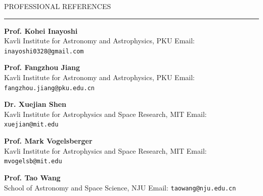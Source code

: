 \documentclass{resume} %
\renewenvironment{rSection}[1]{
\sectionskip
\textcolor{CarnegieMellonRed}{\MakeUppercase{#1}}
\sectionlineskip
\hrule
\begin{list}{}{
\setlength{\leftmargin}{1.5em}
}
\item[]
}{
\end{list}
}
\begin{document}
\begin{rSection}{Professional references} \itemsep -2pt
{\bf Prof. Kohei Inayoshi } \\
Kavli Institute for Astronomy and Astrophysics, PKU \hfill {Email: \texttt{inayoshi0328@gmail.com}}

{\bf Prof. Fangzhou Jiang } \\
Kavli Institute for Astronomy and Astrophysics, PKU \hfill {Email: \texttt{fangzhou.jiang@pku.edu.cn}}

{\bf Dr. Xuejian Shen} \\
Kavli Institute for Astrophysics and Space Research, MIT \hfill {Email: \texttt{xuejian@mit.edu}}


{\bf Prof. Mark Vogelsberger} \\
Kavli Institute for Astrophysics and Space Research, MIT \hfill {Email: \texttt{mvogelsb@mit.edu}}

{\bf Prof. Tao Wang} \\
School of Astronomy and Space Science, NJU
\hfill {Email: \texttt{taowang@nju.edu.cn}}


\end{rSection}
\end{document}
